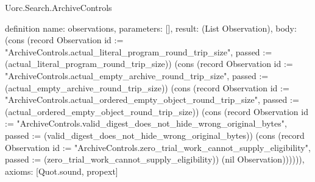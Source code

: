\begin{lexlean}{Uorc.Search.ArchiveControls}
\begin{semanticmodule}
definition{
  name: observations,
  parameters: [],
  result: (List Observation),
  body: (cons (record Observation {id := "ArchiveControls.actual_literal_program_round_trip_size", passed := (actual_literal_program_round_trip_size)}) (cons (record Observation {id := "ArchiveControls.actual_empty_archive_round_trip_size", passed := (actual_empty_archive_round_trip_size)}) (cons (record Observation {id := "ArchiveControls.actual_ordered_empty_object_round_trip_size", passed := (actual_ordered_empty_object_round_trip_size)}) (cons (record Observation {id := "ArchiveControls.valid_digest_does_not_hide_wrong_original_bytes", passed := (valid_digest_does_not_hide_wrong_original_bytes)}) (cons (record Observation {id := "ArchiveControls.zero_trial_work_cannot_supply_eligibility", passed := (zero_trial_work_cannot_supply_eligibility)}) (nil Observation)))))),
  axioms: [Quot.sound, propext]
}
\end{semanticmodule}
\end{lexlean}
